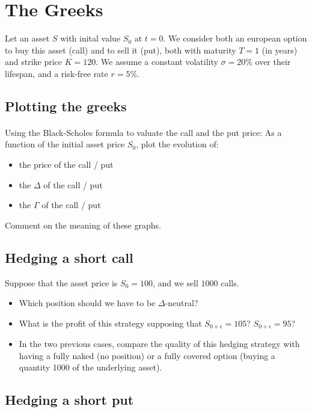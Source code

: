 \section*{The Greeks}

Let an asset $S$ with inital value $S_0$ at $t=0$. We consider both an european option to buy this asset (call) and to sell it (put), both with maturity $T = 1$ (in years) and strike price $K = 120$. We assume a constant volatility $\sigma=20\%$ over their lifespan, and a risk-free rate $r=5\%$. 

\subsection*{Plotting the greeks}


\paragraph{} Using the Black-Scholes formula to valuate the call and the put price:
As a function of the initial asset price $S_0$, plot the evolution of:
\begin{itemize}
    \item the price of the call / put
    \item the $\Delta$ of the call / put
    \item the $\Gamma$ of the call / put
\end{itemize}

\noindent Comment on the meaning of these graphs.


\subsection*{Hedging a short call}

Suppose that the asset price is $S_0 = 100$, and we sell $1000$ calls. 

\begin{itemize}
    \item Which position should we have to be $\Delta$-neutral?
    \item What is the profit of this strategy supposing that $S_{0+\epsilon} = 105$? $S_{0+\epsilon} = 95$? 
    \item In the two previous cases, compare the quality of this hedging strategy with having a fully naked (no position) or a fully covered option (buying a quantity 1000 of the underlying asset).
\end{itemize}


\subsection*{Hedging a short put}

